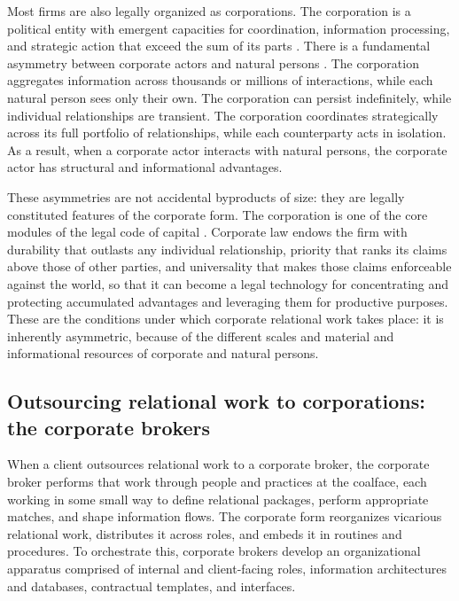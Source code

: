 \documentclass[
]{article}
\begin{document}
Most firms are also legally organized as corporations. The corporation is a political entity with emergent capacities for coordination, information processing, and strategic action that exceed the sum of its parts \autocite{ciepleyPublicPrivatePolitical2013a,farrellUndergroundEmpireHow2023}. There is a fundamental asymmetry between corporate actors and natural persons \autocite{colemanAsymmetricSociety1982,colemanFoundationsSocialTheory1990}. The corporation aggregates information across thousands or millions of interactions, while each natural person sees only their own. The corporation can persist indefinitely, while individual relationships are transient. The corporation coordinates strategically across its full portfolio of relationships, while each counterparty acts in isolation. As a result, when a corporate actor interacts with natural persons, the corporate actor has structural and informational advantages.

These asymmetries are not accidental byproducts of size: they are legally constituted features of the corporate form. The corporation is one of the core modules of the legal code of capital \autocite{pistorCodeCapitalHow2019}. Corporate law endows the firm with durability that outlasts any individual relationship, priority that ranks its claims above those of other parties, and universality that makes those claims enforceable against the world, so that it can become a legal technology for concentrating and protecting accumulated advantages and leveraging them for productive purposes. These are the conditions under which corporate relational work takes place: it is inherently asymmetric, because of the different scales and material and informational resources of corporate and natural persons.

\subsection{Outsourcing relational work to corporations: the corporate brokers}

When a client outsources relational work to a corporate broker, the corporate broker performs that work through people and practices at the coalface, each working in some small way to define relational packages, perform appropriate matches, and shape information flows. The corporate form reorganizes vicarious relational work, distributes it across roles, and embeds it in routines and procedures. To orchestrate this, corporate brokers develop an organizational apparatus comprised of internal and client-facing roles, information architectures and databases, contractual templates, and interfaces.
\end{document}
